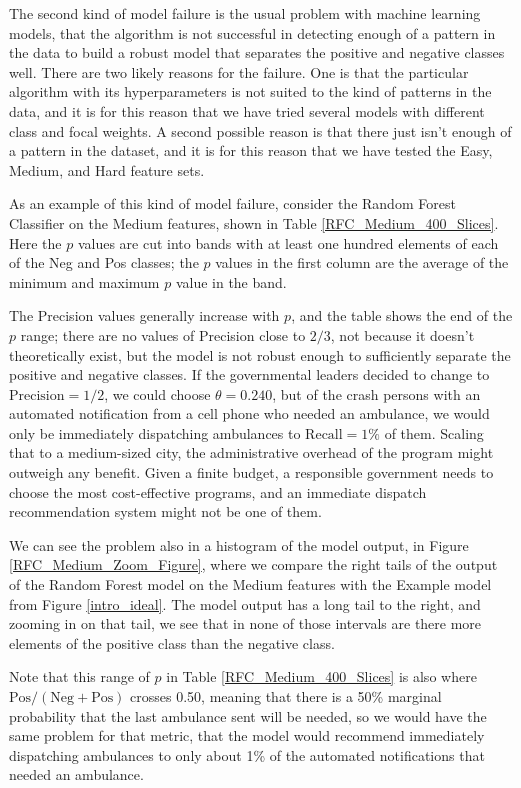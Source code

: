 \FloatBarrier

The second kind of model failure is the usual problem with machine learning models, that the algorithm is not successful in detecting enough of a pattern in the data to build a robust model that separates the positive and negative classes well.  There are two likely reasons for the failure.  One is that the particular algorithm with its hyperparameters is not suited to the kind of patterns in the data, and it is for this reason that we have tried several models with different class and focal weights.  A second possible reason is that there just isn't enough of a pattern in the dataset, and it is for this reason that we have tested the Easy, Medium, and Hard feature sets.  

As an example of this kind of model failure, consider the Random Forest Classifier on the Medium features, shown in Table \ref{RFC_Medium_400_Slices}.  Here the $p$ values are cut into bands with at least one hundred elements of each of the Neg and Pos classes; the $p$ values in the first column are the average of the minimum and maximum $p$ value in the band.  

The Precision values generally increase with $p$, and the table shows the end of the $p$ range; there are no values of Precision close to $2/3$, not because it doesn't theoretically exist, but the model is not robust enough to sufficiently separate the positive and negative classes.  If the governmental leaders decided to change to $\text{Precision} = 1/2$, we could choose $\theta = 0.240$, but of the crash persons with an automated notification from a cell phone who needed an ambulance, we would only be immediately dispatching ambulances to $\text{Recall} = 1\%$ of them.  Scaling that to a medium-sized city, the administrative overhead of the program might outweigh any benefit.  Given a finite budget, a responsible government needs to choose the most cost-effective programs, and an immediate dispatch recommendation system might not be one of them.  

We can see the problem also in a histogram of the model output, in Figure \ref{RFC_Medium_Zoom_Figure}, where we compare the right tails of the output of the Random Forest model on the Medium features with the Example model from Figure \ref{intro_ideal}.  The model output has a long tail to the right, and zooming in on that tail, we see that in none of those intervals are there more elements of the positive class than the negative class.  

Note that this range of $p$ in Table \ref{RFC_Medium_400_Slices} is also where $\text{Pos}/(\text{Neg} + \text{Pos})$ crosses 0.50, meaning that there is a 50\% marginal probability that the last ambulance sent will be needed, so we would have the same problem for that metric, that the model would recommend immediately dispatching ambulances to only about 1\% of the automated notifications that needed an ambulance.  


